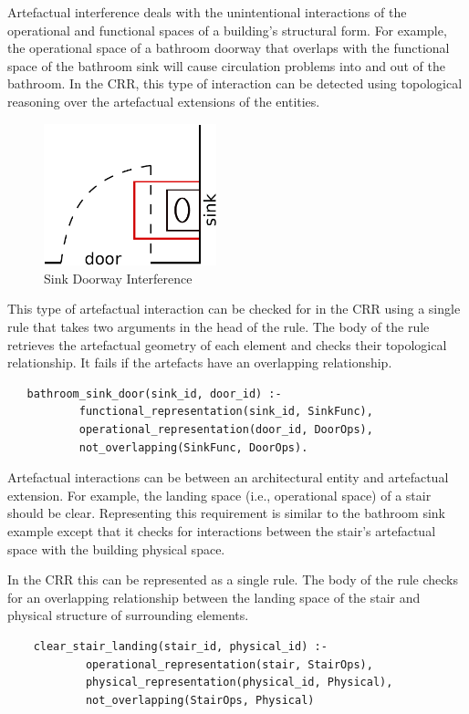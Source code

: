 \documentclass[12pt]{ucthesis}
\begin{document}
Artefactual interference deals with the unintentional interactions of the operational and functional spaces of a building's structural form. For example, the operational space of a bathroom doorway that overlaps with the functional space of the bathroom sink will cause circulation problems into and out of the bathroom. In the CRR, this type of interaction can be detected using topological reasoning over the artefactual extensions of the entities. 

\begin{figure}[H]
\centering
\includegraphics[width=50mm]{door-sink}
\caption{Sink Doorway Interference}
\label{door-sink-example}
\end{figure}

This type of artefactual interaction can be checked for in the CRR using a single rule that takes two arguments in the head of the rule. The body of the rule retrieves the artefactual geometry of each element and checks their topological relationship. It fails if the artefacts have an overlapping relationship.

\begin{verbatim}
   bathroom_sink_door(sink_id, door_id) :- 
           functional_representation(sink_id, SinkFunc),
           operational_representation(door_id, DoorOps),
           not_overlapping(SinkFunc, DoorOps).
\end{verbatim}

Artefactual interactions can be between an architectural entity and artefactual extension. For example, the landing space (i.e., operational space) of a stair should be clear. Representing this requirement is similar to the bathroom sink example except that it checks for interactions between the stair's artefactual space with the building physical space.

In the CRR this can be represented as a single rule. The body of the rule checks for an overlapping relationship between the landing space of the stair and physical structure of surrounding elements.

\begin{verbatim}
    clear_stair_landing(stair_id, physical_id) :- 
            operational_representation(stair, StairOps),
            physical_representation(physical_id, Physical),
            not_overlapping(StairOps, Physical)
\end{verbatim}  
\end{document}
